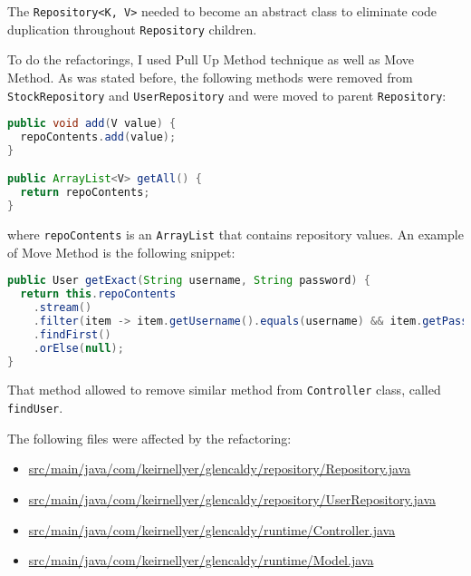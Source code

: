 \documentclass{article}
\newcommand{\code}[1]{\texttt{#1}}
\begin{document}
The \code{Repository<K, V>} needed to become an abstract class to eliminate code duplication throughout \code{Repository} children.

To do the refactorings, I used Pull Up Method technique as well as Move Method. As was stated before, the following methods were removed from \code{StockRepository} and \code{UserRepository} and were moved to parent \code{Repository}:

\begin{lstlisting}[language=Java]
public void add(V value) { 
  repoContents.add(value);
}

public ArrayList<V> getAll() {
  return repoContents;
}
\end{lstlisting}

\noindent where \code{repoContents} is an \code{ArrayList} that contains repository values. An example of Move Method is the following snippet:
\begin{lstlisting}[language=Java]
public User getExact(String username, String password) {
  return this.repoContents
    .stream()
    .filter(item -> item.getUsername().equals(username) && item.getPassword().equals(password))
    .findFirst()
    .orElse(null);
}
\end{lstlisting}

\noindent That method allowed to remove similar method from \code{Controller} class, called \code{findUser}.

The following files were affected by the refactoring:
\begin{itemize}
  \item \href{https://github.com/awave1/assessment-loan-system/commit/aef6c56#diff-db219e7646e5c083f6378ffcd27e73b1}{src/main/java/com/keirnellyer/glencaldy/repository/Repository.java}
  \item \href{https://github.com/awave1/assessment-loan-system/commit/aef6c56#diff-d5fd0798d78d7603accc044c57179943}{src/main/java/com/keirnellyer/glencaldy/repository/UserRepository.java}
  \item \href{https://github.com/awave1/assessment-loan-system/commit/aef6c56#diff-0f417f930dba04b27baaa509b7b80bbf}{src/main/java/com/keirnellyer/glencaldy/runtime/Controller.java}
  \item \href{https://github.com/awave1/assessment-loan-system/commit/aef6c56#diff-d00409191136d5295ea968c2d4446f20}{src/main/java/com/keirnellyer/glencaldy/runtime/Model.java}
\end{itemize}
\end{document}

